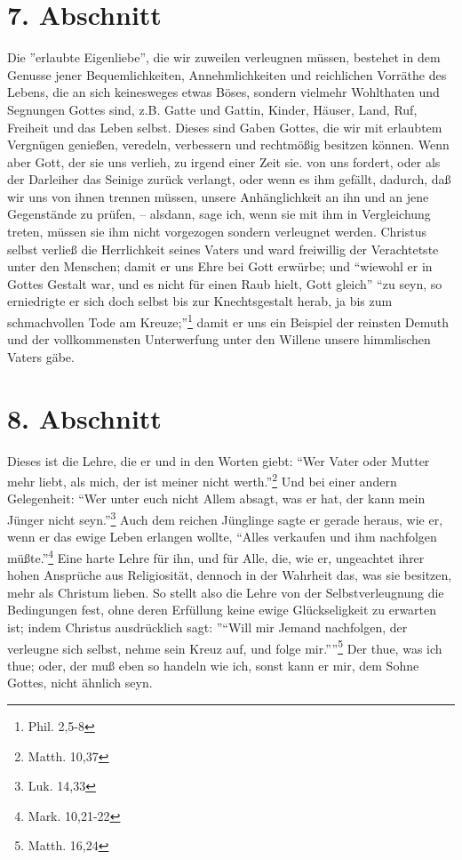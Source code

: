 \section{7. Abschnitt}

Die ''erlaubte Eigenliebe'', die wir zuweilen verleugnen müssen, bestehet in dem
Genusse jener Bequemlichkeiten, Annehmlichkeiten und reichlichen Vorräthe des
Lebens, die an sich keinesweges etwas Böses, sondern vielmehr Wohlthaten und
Segnungen Gottes sind, z.B. Gatte und Gattin, Kinder, Häuser, Land, Ruf,
Freiheit und das Leben selbst. Dieses sind Gaben Gottes, die wir mit erlaubtem
Vergnügen genießen, veredeln, verbessern und rechtmößig besitzen können. Wenn
aber Gott, der sie uns verlieh, zu irgend einer Zeit sie. von uns fordert, oder
als der Darleiher das Seinige zurück verlangt, oder wenn es ihm gefällt,
dadurch, daß wir uns von ihnen trennen müssen, unsere Anhänglichkeit an ihn und
an jene Gegenstände zu prüfen, -- alsdann, sage ich, wenn sie mit ihm in
Vergleichung treten, müssen sie ihm nicht vorgezogen sondern verleugnet werden.
Christus selbst verließ die Herrlichkeit seines Vaters und ward freiwillig der
Verachtetste unter den Menschen; damit er uns Ehre bei Gott erwürbe; und
"`wiewohl er in Gottes Gestalt war, und es nicht für einen Raub hielt, Gott
gleich"' "`zu seyn, so erniedrigte er sich doch selbst bis zur Knechtsgestalt
herab, ja bis zum schmachvollen Tode am Kreuze;"'\footnote{Phil. 2,5-8} damit er
uns ein Beispiel der reinsten Demuth und der vollkommensten Unterwerfung unter
den Willene unsere himmlischen Vaters gäbe.

\section{8. Abschnitt}

Dieses ist die Lehre, die er und in den Worten giebt: "`Wer Vater oder Mutter
mehr liebt, als mich, der ist meiner nicht werth."'\footnote{Matth. 10,37} Und
bei einer andern Gelegenheit: "`Wer unter euch nicht Allem absagt, was er hat,
der kann mein Jünger nicht seyn."'\footnote{Luk. 14,33} Auch dem reichen
Jünglinge sagte er gerade heraus, wie er, wenn er das ewige Leben erlangen
wollte, "`Alles verkaufen und ihm nachfolgen müßte."'\footnote{Mark. 10,21-22}
Eine harte Lehre für ihn, und für Alle, die, wie er, ungeachtet ihrer hohen
Ansprüche aus Religiosität, dennoch in der Wahrheit das, was sie besitzen, mehr
als Christum lieben. So stellt also die Lehre von der Selbstverleugnung die
Bedingungen fest, ohne deren Erfüllung keine ewige Glückseligkeit zu erwarten
ist; indem Christus ausdrücklich sagt: ''"`Will mir Jemand nachfolgen, der
verleugne sich selbst, nehme sein Kreuz auf, und folge mir."'''\footnote{Matth.
16,24} Der thue, was ich thue; oder, der muß eben so handeln wie ich, sonst kann
er mir, dem Sohne Gottes, nicht ähnlich seyn.

